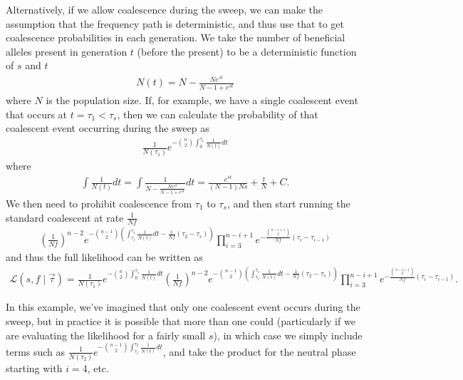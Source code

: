 \documentclass[reqno]{amsart}
\begin{document}
Alternatively, if we allow coalescence during the sweep, we can make the assumption that the frequency path is deterministic, and thus use that to get coalescence probabilities in each generation. We take the number of beneficial alleles present in generation $t$ (before the present) to be a deterministic function of $s$ and $t$
\begin{align}
	N(t) = N - \frac{N e^{st}}{N-1+e^{st}} 
\end{align}
where $N$ is the population size. If, for example, we have a single coalescent event that occurs at $t=\tau_1<\tau_s$, then we can calculate the probability of that coalescent event occurring during the sweep as 
\begin{align}
	\frac{1}{N(\tau_1)}e^{-\binom{n}{2}\int_0^{\tau_1}\frac{1}{N(t)}dt}
\end{align}
where
\begin{align}
	\int\frac{1}{N(t)}dt = \int\frac{1}{N - \frac{Ne^{st}}{N - 1 + e^{st}}}dt = \frac{e^{st}}{\left(N-1\right)Ns} + \frac{t}{N} + C.
\end{align}
We then need to prohibit coalescence from $\tau_1$ to $\tau_s$, and then start running the standard coalescent at rate $\frac{1}{Nf}$
\begin{align}
	\left(\frac{1}{Nf}\right)^{n-2}e^{-\binom{n-1}{2}\left(\int_{\tau_1}^{\tau_s}\frac{1}{N(t)}dt-\frac{1}{Nf}\left(\tau_2-\tau_{s}\right)\right)}\prod_{i=3}^{n-i+1}e^{-\frac{\binom{n-i+1}{2}}{Nf}\left(\tau_i-\tau_{i-1}\right)}
\end{align}
and thus the full likelihood can be written as
\begin{align}
	\mathcal{L}(s,f\mid \vec{\tau})=\frac{1}{N(\tau_1)}e^{-\binom{n}{2}\int_0^{\tau_1}\frac{1}{N(t)}dt}\left(\frac{1}{Nf}\right)^{n-2}e^{-\binom{n-1}{2}\left(\int_{\tau_1}^{\tau_s}\frac{1}{N(t)}dt-\frac{1}{Nf}\left(\tau_2-\tau_{s}\right)\right)}\prod_{i=3}^{n-i+1}e^{-\frac{\binom{n-i+1}{2}}{Nf}\left(\tau_i-\tau_{i-1}\right)}.
\end{align}

In this example, we've imagined that only one coalescent event occurs during the sweep, but in practice it is possible that more than one could (particularly if we are evaluating the likelihood for a fairly small $s$), in which case we simply include terms such as $\frac{1}{N(\tau_2)}e^{-\binom{n-1}{2}\int_{\tau_1}^{\tau_2}\frac{1}{N(t)}dt}$, and take the product for the neutral phase starting with $i=4$, etc.


\end{document}
